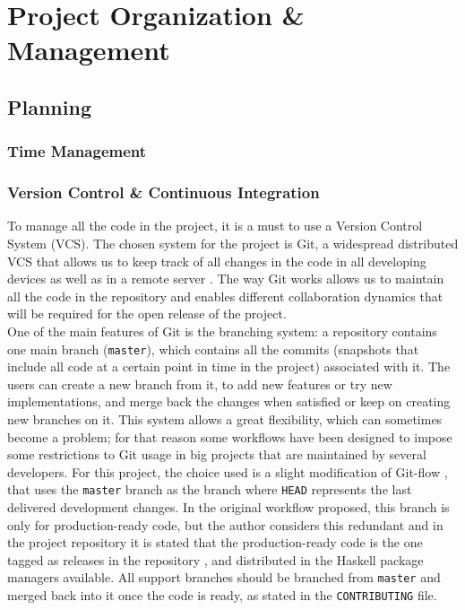 \section{Project Organization \& Management}

\subsection{Planning}

\subsubsection{Time Management}
\subsubsection{Version Control \& Continuous Integration}

To manage all the code in the project, it is a must to use a Version Control
System (VCS). The chosen system for the project is Git, a widespread
distributed VCS that allows us to keep track of all changes in the code in all
developing devices as well as in a remote server \cite{chacon-2009-git}. The
way Git works allows us to maintain all the code in the repository and enables
different collaboration dynamics that will be required for the open release of
the project.\\

One of the main features of Git is the branching system: a repository contains
one main branch (\texttt{master}), which contains all the commits (snapshots
that include all code at a certain point in time in the project) associated
with it. The users can create a new branch from it, to add new features or try
new implementations, and merge back the changes when satisfied or keep on
creating new branches on it. This system allows a great flexibility, which can
sometimes become a problem; for that reason some workflows have been designed
to impose some restrictions to Git usage in big projects that are maintained by
several developers. For this project, the choice used is a slight modification
of Git-flow \cite{driessen-2010-gitflow}, that uses the \texttt{master} branch
as the branch where \texttt{HEAD} represents the last delivered development
changes. In the original workflow proposed, this branch is only for
production-ready code, but the author considers this redundant and in the
project repository it is stated that the production-ready code is the one
tagged as releases in the repository \cite{chacon-2009-git}, and distributed in
the Haskell package managers available. All support branches should be branched
from \texttt{master} and merged back into it once the code is ready, as stated
in the \texttt{CONTRIBUTING} file.\\

